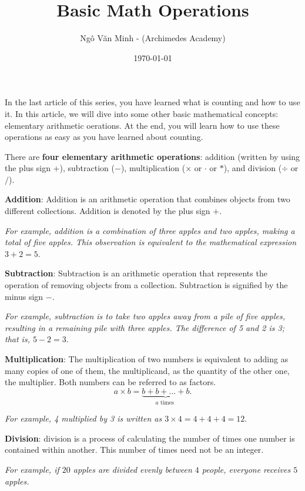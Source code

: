 \documentclass{article}
\title{Basic Math Operations}
\author{Ngô Văn Minh - (Archimedes Academy)}
\date{\today}
\begin{document}
\maketitle

In the last article of this series, you have learned what is counting and how to use it.
In this article, we will dive into some other basic mathematical concepts: elementary arithmetic oerations.
At the end, you will learn how to use these operations as easy as you have learned about counting.

\bigbreak

There are \textbf{four elementary arithmetic operations}:
addition (written by using the plus sign $+$), subtraction ($-$), multiplication ($\times$ or $\cdot$ or $*$),
and division ($\div$ or $/$).
\begin{itemize}[topsep=0pt, partopsep=0pt, itemsep=0pt]
    \ii \textbf{Addition}: Addition is an arithmetic operation that combines objects from two different collections.
    Addition is denoted by the plus sign $+.$


    \textit{For example, addition is a combination of three apples and two apples, making a total of five apples.
This observation is equivalent to the mathematical expression $3 + 2 = 5.$}

    \ii \textbf{Subtraction}: Subtraction is an arithmetic operation that represents the operation of removing objects from a collection.
    Subtraction is signified by the minus sign $-.$
    
    \textit{For example, subtraction is to take two apples away from a pile of five apples, resulting in a remaining pile with three apples.
    The difference of 5 and 2 is 3; that is, $5 - 2 = 3.$}
    
    \ii \textbf{Multiplication}: 
    The multiplication of two numbers is equivalent to adding as many copies of one of them, the multiplicand, as the quantity of the other one, the multiplier. Both numbers can be referred to as factors.
    \[ 
        a \times b = \underbrace{b+b +\ldots +b}_{a \text{\ times\ }}.
    \]
    
    \textit{For example, 4 multiplied by 3 is written as $3\times 4=4+4+4=12.$}

    \ii \textbf{Division}: division is a process of calculating the number of times one number is contained within another.
    This number of times need not be an integer.
    
    \textit{For example, if $20$ apples are divided evenly between $4$ people, everyone receives $5$ apples.}    
\end{itemize}
\end{document}
